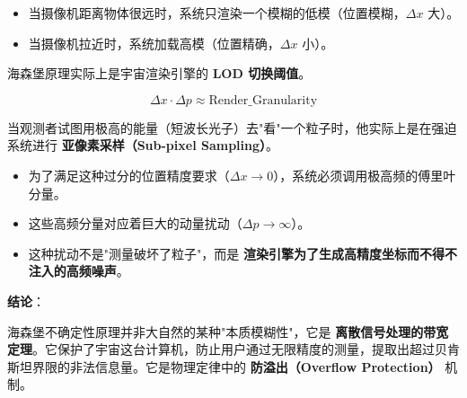 \begin{itemize}
\item 当摄像机距离物体很远时，系统只渲染一个模糊的低模（位置模糊，$\Delta x$ 大）。

\item 当摄像机拉近时，系统加载高模（位置精确，$\Delta x$ 小）。
\end{itemize}

海森堡原理实际上是宇宙渲染引擎的 \textbf{LOD 切换阈值}。

\begin{equation}
\Delta x \cdot \Delta p \approx \text{Render\_Granularity}
\end{equation}

当观测者试图用极高的能量（短波长光子）去"看"一个粒子时，他实际上是在强迫系统进行 \textbf{亚像素采样（Sub-pixel Sampling）}。

\begin{itemize}
\item 为了满足这种过分的位置精度要求（$\Delta x \to 0$），系统必须调用极高频的傅里叶分量。

\item 这些高频分量对应着巨大的动量扰动（$\Delta p \to \infty$）。

\item 这种扰动不是"测量破坏了粒子"，而是 \textbf{渲染引擎为了生成高精度坐标而不得不注入的高频噪声}。
\end{itemize}

\textbf{结论}：

海森堡不确定性原理并非大自然的某种"本质模糊性"，它是 \textbf{离散信号处理的带宽定理}。它保护了宇宙这台计算机，防止用户通过无限精度的测量，提取出超过贝肯斯坦界限的非法信息量。它是物理定律中的 \textbf{防溢出（Overflow Protection）} 机制。
